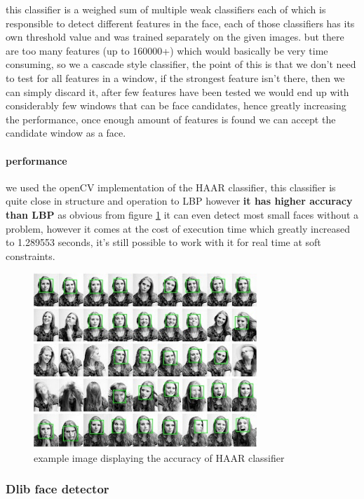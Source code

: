 this classifier is a weighed sum of multiple weak classifiers each of which is responsible to detect different features in the face, each of those classifiers has its own threshold value and was trained separately on the given images.
but there are too many features (up to 160000+) which would basically be very time consuming, so we a cascade style classifier, the point of this is that we don't need to test for all features in a window, if the strongest feature isn't there, then we can simply discard it, after few features have been tested we would end up with considerably few windows that can be face candidates, hence greatly increasing the performance, once enough amount of features is found we can accept the candidate window as a face.

\paragraph{performance}
we used the openCV implementation of the HAAR classifier, this classifier is quite close in structure and operation to LBP however \textbf{it has higher accuracy than LBP } as obvious from figure \ref{fig:haar_example} it can even detect most small faces without a problem, however it comes at the cost of execution time which greatly increased to 1.289553 seconds, it's still possible to work with it for real time at soft constraints.
\begin{figure}
	\centering
	\includegraphics[width=0.75\textwidth]{images/haar_example.jpg}
	\caption{example image displaying the accuracy of HAAR classifier}
	\label{fig:haar_example}
\end{figure}


\subsubsection{Dlib face detector}
